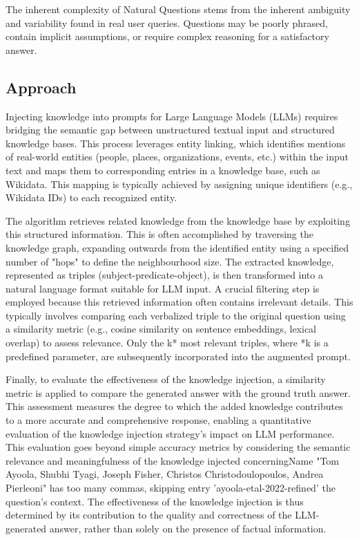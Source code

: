 \documentclass{article}
\begin{document}
The inherent complexity of Natural Questions stems from the inherent ambiguity and variability found in real user queries. Questions may be poorly phrased, contain implicit assumptions, or require complex reasoning for a satisfactory answer.

\subsection{Approach}

Injecting knowledge into prompts for Large Language Models (LLMs) requires bridging the semantic gap between unstructured textual input and structured knowledge bases. This process leverages entity linking, which identifies mentions of real-world entities (people, places, organizations, events, etc.) within the input text and maps them to corresponding entries in a knowledge base, such as Wikidata. This mapping is typically achieved by assigning unique identifiers (e.g., Wikidata IDs) to each recognized entity.

The algorithm retrieves related knowledge from the knowledge base by exploiting this structured information. This is often accomplished by traversing the knowledge graph, expanding outwards from the identified entity using a specified number of "hops" to define the neighbourhood size. The extracted knowledge, represented as triples (subject-predicate-object), is then transformed into a natural language format suitable for LLM input. A crucial filtering step is employed because this retrieved information often contains irrelevant details. This typically involves comparing each verbalized triple to the original question using a similarity metric (e.g., cosine similarity on sentence embeddings, lexical overlap) to assess relevance. Only the k* most relevant triples, where *k is a predefined parameter, are subsequently incorporated into the augmented prompt.

Finally, to evaluate the effectiveness of the knowledge injection, a similarity metric is applied to compare the generated answer with the ground truth answer. This assessment measures the degree to which the added knowledge contributes to a more accurate and comprehensive response, enabling a quantitative evaluation of the knowledge injection strategy's impact on LLM performance. This evaluation goes beyond simple accuracy metrics by considering the semantic relevance and meaningfulness of the knowledge injected concerningName "Tom Ayoola, Shubhi Tyagi, Joseph Fisher, Christos Christodoulopoulos, Andrea Pierleoni" has too many commas, skipping entry 'ayoola-etal-2022-refined' the question's context. The effectiveness of the knowledge injection is thus determined by its contribution to the quality and correctness of the LLM-generated answer, rather than solely on the presence of factual information.
\end{document}
